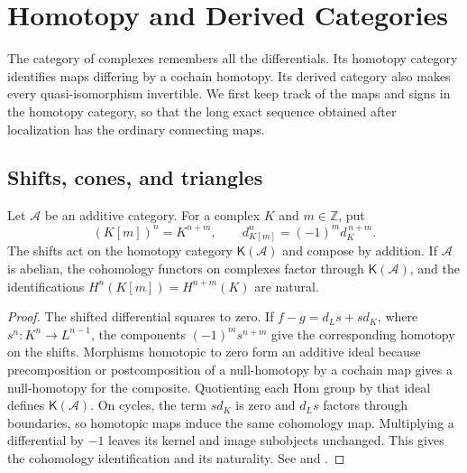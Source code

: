 \chapter{Homotopy and Derived Categories}
\label{ch:derived-categories}

The category of complexes remembers all the differentials. Its homotopy
category identifies maps differing by a cochain homotopy. Its derived
category also makes every quasi-isomorphism invertible. We first keep track
of the maps and signs in the homotopy category, so that the long exact
sequence obtained after localization has the ordinary connecting maps.

\section{Shifts, cones, and triangles}

\begin{proposition}\label{res:K01}
Let \(\mathcal A\) be an additive category. For a complex \(K\) and
\(m\in\mathbb Z\), put
\[
 (K[m])^n=K^{n+m},\qquad d_{K[m]}^n=(-1)^m d_K^{\,n+m}.
\]
The shifts act on the homotopy category \(\mathsf K(\mathcal A)\) and
compose by addition. If \(\mathcal A\) is abelian, the cohomology functors
on complexes factor through \(\mathsf K(\mathcal A)\), and the
identifications \(H^n(K[m])=H^{n+m}(K)\) are natural.
\end{proposition}
\begin{proof}
The shifted differential squares to zero. If \(f-g=d_L s+s d_K\), where
\(s^n:K^n\to L^{n-1}\), the components \((-1)^m s^{n+m}\) give the
corresponding homotopy on the shifts. Morphisms homotopic to zero form an
additive ideal because precomposition or postcomposition of a
null-homotopy by a cochain map gives a null-homotopy for the composite. Quotienting each
Hom group by that ideal defines \(\mathsf K(\mathcal A)\). On cycles,
the term \(s d_K\) is zero and \(d_L s\) factors through boundaries, so
homotopic maps induce the same cohomology map. Multiplying a differential
by \(-1\) leaves its kernel and image subobjects unchanged. This gives
the cohomology identification and its naturality. See
\cite[Tags 013H and 05RS]{stacks-derived} and
\cite[Section 4.1]{yekutieli}.
\end{proof}

